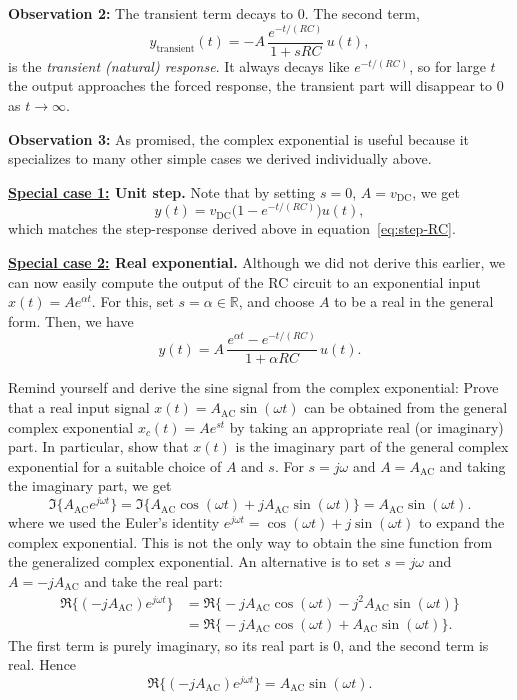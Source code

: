 \textbf{Observation 2:} The transient term decays to 0. The second term,
  \[
  y_{\text{transient}}(t)=-A\,\frac{e^{-t/(RC)}}{1+sRC}\,u(t),
  \]
  is the \emph{transient (natural) response}. It always decays like $e^{-t/(RC)}$, so for large $t$ the output approaches the forced response, the transient part will disappear to 0 as $t\to\infty$.

\textbf{Observation 3:} As promised, the complex exponential is useful because it specializes to many other simple cases we derived individually above.

\textbf{\ul{Special case 1:} Unit step.} Note that by setting $s=0$, $A=v_{\text{DC}}$, we get 
    \[
    y(t)=v_{\text{DC}}\big(1-e^{-t/(RC)}\big)u(t),
    \]
    which matches the step-response derived above in equation~\eqref{eq:step-RC}.

\textbf{\ul{Special case 2:} Real exponential.} Although we did not derive this earlier, we can now easily compute the output of the RC circuit to an exponential input $x(t) = Ae^{\alpha t}$. For this, set $s=\alpha\in\mathbb{R}$, and choose $A$ to be a real in the general form. Then, we have
    \[
    y(t)=A\,\frac{e^{\alpha t}-e^{-t/(RC)}}{1+\alpha RC}\,u(t).
    \]

\begin{popquiz} 
Remind yourself and derive the sine signal from the complex exponential: Prove that a real input signal $x(t)=A_{\text{AC}}\sin(\omega t)$ can be obtained from the general complex exponential $x_c(t)=A e^{st}$ by taking an appropriate real (or imaginary) part. In particular, show that $x(t)$ is the imaginary part of the general complex exponential for a suitable choice of $A$ and $s$. 
\popqsplit
For $s = j\omega$ and $A = A_{\text{AC}}$ and taking the imaginary part, we get
\[
\Im\!\big\{A_{\text{AC}}e^{j\omega t}\big\}
=\Im\!\big\{A_{\text{AC}}\cos(\omega t)+jA_{\text{AC}}\sin(\omega t)\big\}
=A_{\text{AC}}\sin(\omega t).
\]
where we used the Euler's identity $e^{j\omega t}=\cos(\omega t)+j\sin(\omega t)$ to expand the complex exponential. This is not the only way to obtain the sine function from the generalized complex exponential. An alternative is to set $s=j\omega$ and $A=-jA_{\text{AC}}$ and take the real part:
\begin{align*}
\Re\!\big\{(-jA_{\text{AC}})e^{j\omega t}\big\}
&=\Re\!\big\{-jA_{\text{AC}}\cos(\omega t)-j^2A_{\text{AC}}\sin(\omega t)\big\}\\
&=\Re\!\big\{-jA_{\text{AC}}\cos(\omega t)+A_{\text{AC}}\sin(\omega t)\big\}.
\end{align*}
The first term is purely imaginary, so its real part is $0$, and the second term is real. Hence
\[
\Re\!\big\{(-jA_{\text{AC}})e^{j\omega t}\big\}
= A_{\text{AC}}\sin(\omega t).
\]
\end{popquiz}


